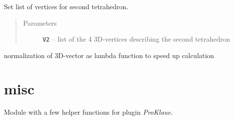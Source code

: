 \documentclass[letterpaper,10pt,english]{sphinxmanual}
\begin{document}
\begin{fulllineitems}
\begin{fulllineitems}
\begin{quote}
\begin{description}
\begin{itemize}
\end{itemize}

\end{description}\end{quote}

\end{fulllineitems}


\begin{fulllineitems}
\label{pk_src.intersection_tet_tet:pk_src.intersection_tet_tet.intersection_tet_tet.setV2}
Set list of vertices for second tetrahedron.
\begin{quote}\begin{description}
\item[{Parameters}] \leavevmode
\textbf{\texttt{V2}} -- list of the 4 3D-vertices describing the second tetrahedron

\end{description}\end{quote}

\end{fulllineitems}


\end{fulllineitems}


\begin{fulllineitems}
\label{pk_src.intersection_tet_tet:pk_src.intersection_tet_tet.normalize}
normalization of 3D-vector as lambda function to speed up calculation

\end{fulllineitems}



\section{misc}
\label{pk_src.misc:misc}\label{pk_src.misc::doc}\label{pk_src.misc:id1}
{\hyperref[index:sec\string-misc]{}}
\label{pk_src.misc:module-pk_src.misc}
Module with a few helper functions for plugin \emph{ProKlaue}.
\end{document}
